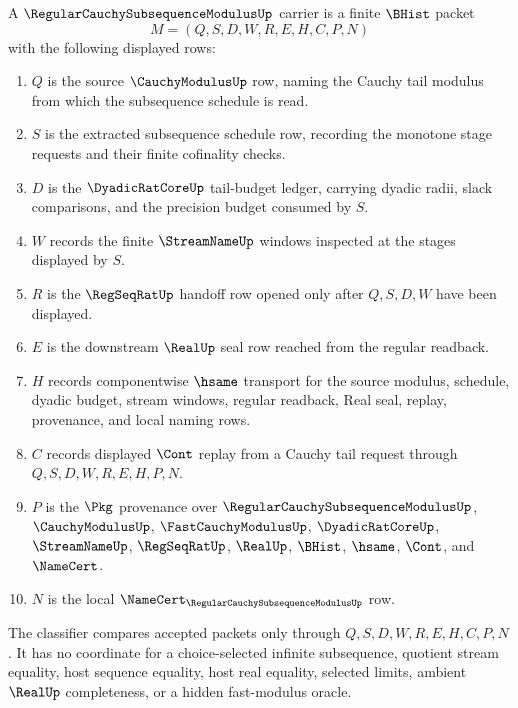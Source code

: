 \begin{definition}
\label{def:regular-cauchy-subsequence-modulus-carrier}
A $\RegularCauchySubsequenceModulusUp$ carrier is a finite $\BHist$ packet
$$
M=(Q,S,D,W,R,E,H,C,P,N)
$$
with the following displayed rows:
\begin{enumerate}
\item $Q$ is the source $\CauchyModulusUp$ row, naming the Cauchy tail modulus from which the subsequence schedule is read.
\item $S$ is the extracted subsequence schedule row, recording the monotone stage requests and their finite cofinality checks.
\item $D$ is the $\DyadicRatCoreUp$ tail-budget ledger, carrying dyadic radii, slack comparisons, and the precision budget consumed by $S$.
\item $W$ records the finite $\StreamNameUp$ windows inspected at the stages displayed by $S$.
\item $R$ is the $\RegSeqRatUp$ handoff row opened only after $Q,S,D,W$ have been displayed.
\item $E$ is the downstream $\RealUp$ seal row reached from the regular readback.
\item $H$ records componentwise $\hsame$ transport for the source modulus, schedule, dyadic budget, stream windows, regular readback, Real seal, replay, provenance, and local naming rows.
\item $C$ records displayed $\Cont$ replay from a Cauchy tail request through $Q,S,D,W,R,E,H,P,N$.
\item $P$ is the $\Pkg$ provenance over $\RegularCauchySubsequenceModulusUp$, $\CauchyModulusUp$, $\FastCauchyModulusUp$, $\DyadicRatCoreUp$, $\StreamNameUp$, $\RegSeqRatUp$, $\RealUp$, $\BHist$, $\hsame$, $\Cont$, and $\NameCert$.
\item $N$ is the local $\NameCert_{\RegularCauchySubsequenceModulusUp}$ row.
\end{enumerate}
The classifier compares accepted packets only through $Q,S,D,W,R,E,H,C,P,N$. It has no coordinate for a choice-selected infinite subsequence, quotient stream equality, host sequence equality, host real equality, selected limits, ambient $\RealUp$ completeness, or a hidden fast-modulus oracle.
\end{definition}

